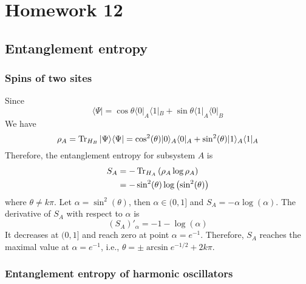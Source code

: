 \newpage
\section{Homework 12}
\subsection{Entanglement entropy}
\subsubsection{Spins of two sites}
Since 
\begin{equation}
	\langle \Psi | = \cos \theta \langle 0 |_A \langle 1|_B + \sin \theta \langle 1|_A \langle 0|_B
\end{equation}
We have 
\begin{equation}
	\rho_A = \operatorname{Tr}_{H_B} | \Psi\rangle \langle \Psi | = \cos^2(\theta) | 0\rangle_A \langle 0|_A + \sin^2(\theta) | 1 \rangle_A \langle 1 |_A
\end{equation}
Therefore, the entanglement entropy for subsystem $A$ is 
\begin{equation}
	\begin{split}
	S_A & = - \operatorname{Tr}_{H_A} \left( \rho_A \log \rho_A \right)\\
	& = - \sin^2(\theta) \log\left( \sin^2(\theta)\right)\\
	\end{split}
\end{equation}
where $\theta \neq k \pi $. Let $\alpha = \sin^2(\theta)$, then $\alpha \in (0, 1]$ and $S_A= - \alpha \log\left(\alpha\right)$. The derivative of $S_A$ with respect to $\alpha$ is
\begin{equation}
	(S_A)'_\alpha = -1 - \log(\alpha)
\end{equation} 
It decreases at $(0, 1]$ and reach zero at point $\alpha = e^{-1}$. Therefore, $S_A$ reaches the maximal value at $\alpha= e^{-1}$, i.e., $\theta =\pm \arcsin e^{-1/2}+ 2k\pi$.
\subsubsection{Entanglement entropy of harmonic oscillators}
